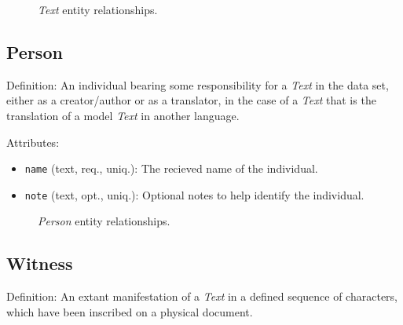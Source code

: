 \begin{figure}[ht]
    \begin{center}
        
    \end{center}
\label{fig:TextER}
\caption{\textit{Text} entity relationships.}
\end{figure}


\subsection{Person}

Definition: An individual bearing some responsibility for a \textit{Text} in the data set, either as a creator/author or as a translator, in the case of a \textit{Text} that is the translation of a model \textit{Text} in another language.

\vspace{1em}
\noindent Attributes:
\begin{itemize}
    \item \texttt{name} (text, req., uniq.): The recieved name of the individual.
    \item \texttt{note} (text, opt., uniq.): Optional notes to help identify the individual.
\end{itemize}

\begin{figure}[ht]
    \begin{center}
        
    \end{center}
\label{fig:PersonER}
\caption{\textit{Person} entity relationships.}
\end{figure}


\subsection{Witness}

Definition: An extant manifestation of a \textit{Text} in a defined sequence of characters, which have been inscribed on a physical document.

